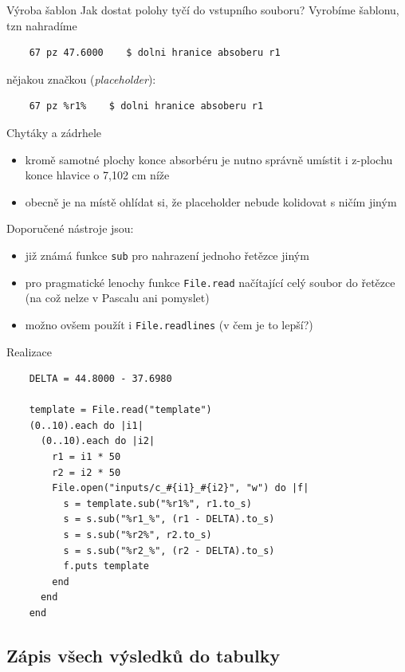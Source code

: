 \documentclass{beamer}
\begin{document}
\begin{frame}[fragile]{Výroba šablon}
  Jak dostat polohy tyčí do vstupního souboru? Vyrobíme šablonu, tzn nahradíme
  \begin{verbatim}
    67 pz 47.6000    $ dolni hranice absoberu r1
  \end{verbatim}
  \pause
  nějakou značkou (\emph{placeholder}):
  \begin{verbatim}
    67 pz %r1%    $ dolni hranice absoberu r1
  \end{verbatim}
\end{frame}

\begin{frame}{Chytáky a zádrhele}
  \begin{itemize}
    \item kromě samotné plochy konce absorbéru je nutno správně umístit i z-plochu konce hlavice o 7,102 cm níže
    \item obecně je na místě ohlídat si, že placeholder nebude kolidovat s ničím jiným
  \end{itemize}
  Doporučené nástroje jsou:
  \begin{itemize}
    \item již známá funkce \texttt{sub} pro nahrazení jednoho řetězce jiným
    \item pro pragmatické lenochy funkce \texttt{File.read} načítající celý soubor do řetězce (na což nelze v Pascalu ani pomyslet)
    \item možno ovšem použít i \texttt{File.readlines} (v čem je to lepší?)
  \end{itemize}
\end{frame}

\begin{frame}[fragile]{Realizace}
  \scriptsize
  \begin{verbatim}
    DELTA = 44.8000 - 37.6980

    template = File.read("template")
    (0..10).each do |i1|
      (0..10).each do |i2|
        r1 = i1 * 50
        r2 = i2 * 50
        File.open("inputs/c_#{i1}_#{i2}", "w") do |f|
          s = template.sub("%r1%", r1.to_s)
          s = s.sub("%r1_%", (r1 - DELTA).to_s)
          s = s.sub("%r2%", r2.to_s)
          s = s.sub("%r2_%", (r2 - DELTA).to_s)
          f.puts template
        end
      end
    end
  \end{verbatim}
\end{frame}

\subsection{Zápis všech výsledků do tabulky}
\end{document}
